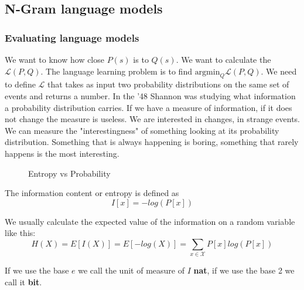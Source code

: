 \subsection{N-Gram language models}
\label{sec:n_gram_language_models}

\subsubsection{Evaluating language models}

We want to know how close $P(s)$ is to $Q(s)$.
We want to calculate the $\mathcal{L}(P,Q)$. The language learning problem is to find $\text{argmin}_Q\mathcal{L}(P,Q)$.
We need to define $\mathcal{L}$ that takes as input two probability distributions on the same set of events and returns a number.
In the '48 Shannon was studying what information a probability distribution carries.
If we have a measure of information, if it does not change the measure is useless. We are interested in changes, in strange
events. We can measure the "interestingness" of something looking at its probability distribution.
Something that is always happening is boring, something that rarely happens is the most interesting.

\begin{figure}[H]
    \centering
    \caption{Entropy vs Probability}
    \label{fig:entropy_vs_probability}
\end{figure}

The information content or entropy is defined as
\[
    I[x]=-log(P[x])
\]

We usually calculate the expected value of the information on a 
random variable like this:
\[
    H(X)=E[I(X)]=E[-log(X)]=\sum_{x\in\mathcal{X}}P[x]log(P[x])
\]

If we use the base $e$ we call the unit of measure of $I$ \textbf{nat},
if we use the base 2 we call it \textbf{bit}.

